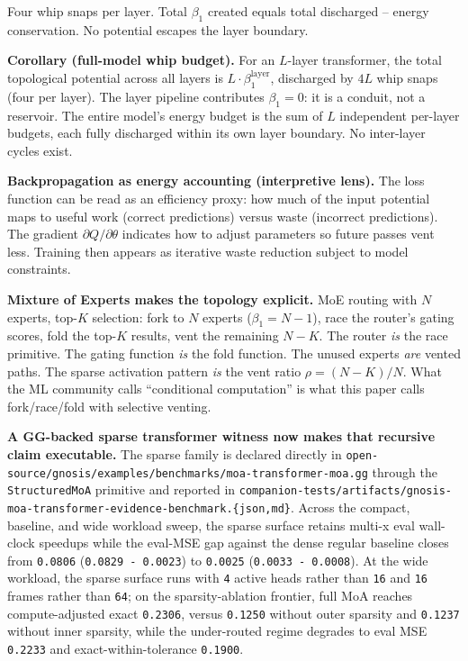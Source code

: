 \documentclass[
  11pt,
]{article}
\begin{document}
Four whip snaps per layer. Total \(\beta_1\) created equals total
discharged -- energy conservation. No potential escapes the layer
boundary.

\textbf{Corollary (full-model whip budget).} For an \(L\)-layer
transformer, the total topological potential across all layers is
\(L \cdot \beta_1^{\text{layer}}\), discharged by \(4L\) whip snaps
(four per layer). The layer pipeline contributes \(\beta_1 = 0\): it is
a conduit, not a reservoir. The entire model's energy budget is the sum
of \(L\) independent per-layer budgets, each fully discharged within its
own layer boundary. No inter-layer cycles exist.

\textbf{Backpropagation as energy accounting (interpretive lens).} The
loss function can be read as an efficiency proxy: how much of the input
potential maps to useful work (correct predictions) versus waste
(incorrect predictions). The gradient \(\partial Q / \partial \theta\)
indicates how to adjust parameters so future passes vent less. Training
then appears as iterative waste reduction subject to model constraints.

\textbf{Mixture of Experts makes the topology explicit.} MoE routing
with \(N\) experts, top-\(K\) selection: fork to \(N\) experts
(\(\beta_1 = N - 1\)), race the router's gating scores, fold the
top-\(K\) results, vent the remaining \(N - K\). The router \emph{is}
the race primitive. The gating function \emph{is} the fold function. The
unused experts \emph{are} vented paths. The sparse activation pattern
\emph{is} the vent ratio \(\rho = (N - K)/N\). What the ML community
calls ``conditional computation'' is what this paper calls
fork/race/fold with selective venting.

\textbf{A GG-backed sparse transformer witness now makes that recursive
claim executable.} The sparse family is declared directly in
\texttt{open-\allowbreak{}source/\allowbreak{}gnosis/\allowbreak{}examples/\allowbreak{}benchmarks/\allowbreak{}moa-\allowbreak{}transformer-\allowbreak{}moa.\allowbreak{}gg}
through the \texttt{StructuredMoA} primitive and reported in
\texttt{companion-\allowbreak{}tests/\allowbreak{}artifacts/\allowbreak{}gnosis-\allowbreak{}moa-\allowbreak{}transformer-\allowbreak{}evidence-\allowbreak{}benchmark.\allowbreak{}\{json,md\}}.
Across the compact, baseline, and wide workload sweep, the sparse
surface retains multi-x eval wall-clock speedups while the eval-MSE gap
against the dense regular baseline closes from \texttt{0.0806}
(\texttt{0.0829\ -\ 0.0023}) to \texttt{0.0025}
(\texttt{0.0033\ -\ 0.0008}). At the wide workload, the sparse surface
runs with \texttt{4} active heads rather than \texttt{16} and
\texttt{16} frames rather than \texttt{64}; on the sparsity-ablation
frontier, full MoA reaches compute-adjusted exact \texttt{0.2306},
versus \texttt{0.1250} without outer sparsity and \texttt{0.1237}
without inner sparsity, while the under-routed regime degrades to eval
MSE \texttt{0.2233} and exact-within-tolerance \texttt{0.1900}.
\end{document}
